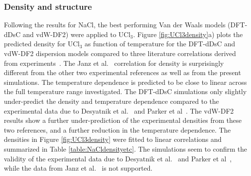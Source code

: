 \documentclass[preprint,3p,10pt,onecolumn,number,sort&compress]{elsarticle}
\begin{document}
{\subsubsection{Density and structure}
Following the results for NaCl, the best performing Van der Waals models (DFT-dDsC and vdW-DF2) were applied to UCl$_3$. Figure \ref{fig:UCl3density}a) plots the predicted density for UCl$_3$ as function of temperature for the DFT-dDsC and vdW-DF2 dispersion models compared to three literature correlations derived from experiments~\cite{Janz1988,Desyatnik,Parker}. The Janz et al.~\cite{Janz1988} correlation for density is surprisingly different from the other two experimental references as well as from the present simulations. The temperature dependence is predicted to be close to linear across the full temperature range investigated. The DFT-dDsC simulations only slightly under-predict the density and temperature dependence compared to the experimental data due to Desyatnik et al.~\cite{Desyatnik} and Parker et al~\cite{Parker}. The vdW-DF2 results show a further under-prediction of the experimental densities from these two references, and a further reduction in the temperature dependence. The densities in Figure \ref{fig:UCl3density} were fitted to linear correlations and summarized in Table \ref{table:NaCldensityetc}. The simulations seem to confirm the validity of the experimental data due to Desyatnik et al.~\cite{Desyatnik} and Parker et al~\cite{Parker}, while the data from Janz et al.~\cite{Janz1988} is not supported.



 
}
\end{document}
